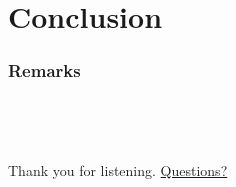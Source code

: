 \documentclass{beamer}
\begin{document}

    \section{Conclusion}

    \begin{frame}
        \frametitle{Remarks}
    \end{frame}
   
    \section{}
    \begin{frame}
        \frametitle{~}

        \begin{center}
            Thank you for listening.
            \underline{Questions?}
        \end{center}
    \end{frame}
\end{document}
